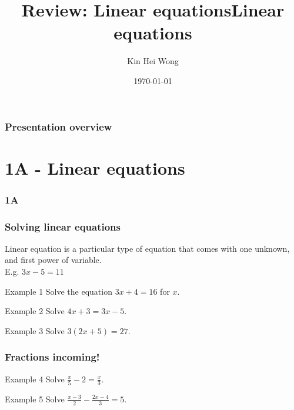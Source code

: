 \documentclass{beamer}
\title{Review: Linear equations}
\author{Kin Hei Wong}
\date{\today}
\newcommand{\blank}{\begin{frame}\end{frame}}
\begin{document}
\begin{frame}
    \titlepage
\end{frame}

\begin{frame}
    \frametitle{Presentation overview}
    \tableofcontents
\end{frame}

\section{1A - Linear equations}
\begin{frame}
    \frametitle{1A}
    \begin{center}
        \title{Linear equations}
        \maketitle
    \end{center}
\end{frame}

\begin{frame}[t]
    \frametitle{Solving linear equations}
    Linear equation is a particular type of equation that comes with one unknown, and first power of variable.\\
    E.g. $3x - 5 = 11$
    \begin{block}{Example 1}
        Solve the equation $3x + 4 = 16$ for $x$.
    \end{block}

    \begin{block}{Example 2}
        Solve $4x + 3 = 3x - 5$.
    \end{block}

    \begin{block}{Example 3}
        Solve $3(2x+5) = 27$.
    \end{block}
\end{frame}

\begin{frame}[t]
    \frametitle{Fractions incoming!}
    \begin{block}{Example 4}
        Solve $\frac{x}{5} - 2 = \frac{x}{3}$.
    \end{block}

    \begin{block}{Example 5}
        Solve $\frac{x-3}{2} - \frac{2x-4}{3} = 5$.
    \end{block}
\end{frame}
\blank
\end{document}
